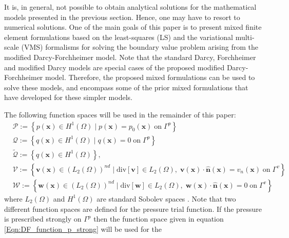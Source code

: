 \documentclass[11pt,reqno]{amsart}
\begin{document}
It is, in general, not possible to obtain analytical 
solutions for the mathematical models presented in 
the previous section. Hence, one may have to resort 
to numerical solutions. One of the main goals of 
this paper is to present mixed finite element 
formulations based on the least-squares (LS) and the 
variational multi-scale (VMS) formalisms for solving 
the boundary value problem arising from the 
modified Darcy-Forchheimer model. Note that 
the standard Darcy, Forchheimer and modified 
Darcy models are special cases of the proposed 
modified Darcy-Forchheimer model. Therefore, 
the proposed mixed formulations can be used 
to solve these models, and encompass some 
of the prior mixed formulations that have 
developed for these simpler models.

The following function spaces will be used 
in the remainder of this paper: 
\begin{subequations}
  \begin{align}
    \label{Eqn:DF_function_p_strong}
    &\mathcal{P} := \left\{p(\mathbf{x}) \in H^{1}(\Omega) 
    \; \vert \; p(\mathbf{x}) = p_0(\mathbf{x}) \; \mathrm{on} 
    \; \Gamma^{p} \right\} \\
\label{Eqn:DF_function_q_strong}
    &\mathcal{Q} := \left\{q(\mathbf{x}) \in H^{1}(\Omega) 
    \; \vert \; q(\mathbf{x}) = 0 \; \mathrm{on} \; 
    \Gamma^{p} \right\} \\
\label{Eqn:DF_function_q_weak}
    &\widetilde{\mathcal{Q}} := \left\{q(\mathbf{x}) 
     \in H^{1}(\Omega) \right\}, \\
&\mathcal{V} := \left\{\mathbf{v}(\mathbf{x}) 
    \in \left(L_2(\Omega)\right)^{nd} \; \vert \; 
    \mathrm{div}[\mathbf{v}] \in L_2(\Omega), \; 
    \mathbf{v}(\mathbf{x}) \cdot \hat{\mathbf{n}}
    (\mathbf{x}) = v_n(\mathbf{x}) \; \mathrm{on} 
    \; \Gamma^{v} \right\} \\
&\mathcal{W} := \left\{\mathbf{w}(\mathbf{x}) 
    \in \left(L_2(\Omega)\right)^{nd} \; \vert \; 
    \mathrm{div}[\mathbf{w}] \in L_2(\Omega), \; 
    \mathbf{w}(\mathbf{x}) \cdot \hat{\mathbf{n}} 
    (\mathbf{x}) = 0 \; \mathrm{on} \; \Gamma^{v} 
    \right\}
  \end{align}
\end{subequations}
where $L_2(\Omega)$ and $H^{1}(\Omega)$ are standard 
Sobolev spaces \cite{Brezzi_Fortin}. Note that two 
different function spaces are defined for the pressure 
trial function. If the pressure is prescribed strongly 
on $\Gamma^{p}$ then the function space given in equation 
\eqref{Eqn:DF_function_p_strong} will be used for the 
\end{document}
